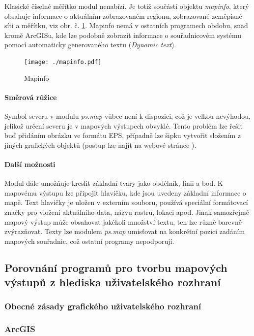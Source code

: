 \documentclass[a4paper,12pt,draft]{article}
\newcommand{\modul}[1]{\emph{#1}}
\begin{document}
Klasické číselné měřítko modul nenabízí. Je totiž součástí objektu \emph{mapinfo}, který obsahuje informace o aktuálním zobrazovaném regionu, zobrazované zeměpisné síti a měřítku, viz obr. č. \ref{fig:mapinfo}. Mapinfo nemá v ostatních programech obdobu, snad kromě ArcGISu, kde lze podobně zobrazit informace o souřadnicovém systému pomocí automaticky generovaného textu (\emph{Dynamic text}). 
\begin{figure}[h!]
    \centering
    \texttt{[image: ./mapinfo.pdf]}
    \caption{Mapinfo}
    \label{fig:mapinfo}
\end{figure}

\paragraph*{Směrová růžice}
Symbol severu v modulu \modul{ps.map} vůbec není k dispozici, což je velkou nevýhodou, jelikož určení severu je v mapových výstupech obvyklé. Tento problém lze řešit buď přidáním obrázku ve formátu EPS, případně lze šipku vytvořit složením z jiných grafických objektů (postup lze najít na webové stránce \cite{wiki_psmap_north}).

\paragraph*{Další možnosti}
Modul dále umožňuje kreslit základní tvary jako obdélník, linii a bod. K mapovému výstupu lze připojit hlavičku, kde jsou uvedeny základní informace o mapě. Text hlavičky je uložen v externím souboru, používá speciální formátovací značky pro vložení aktuálního data, názvu rastru, lokaci apod. Jinak samozřejmě mapový výstup může obsahovat jakékoli množství textu, ten lze různě barevně zvýrazňovat. Texty lze modulem \modul{ps.map} umisťovat na konkrétní pozici zadáním mapových souřadnic, což ostatní programy nepodporují. 




\subsection{Porovnání programů pro tvorbu mapových výstupů z hlediska uživatelského rozhraní }
\subsubsection{Obecné zásady grafického uživatelského rozhraní}
\subsubsection{ArcGIS}
\end{document}

